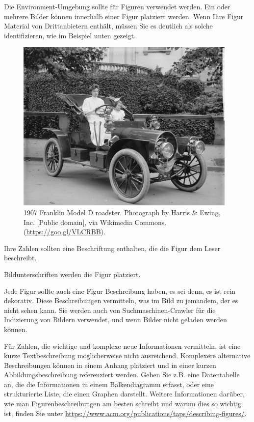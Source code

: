 \documentclass[manuscript,screen,review]{acmart}
\begin{document}
Die Environment-Umgebung sollte für Figuren verwendet werden. Ein oder mehrere Bilder können innerhalb einer Figur platziert werden. Wenn Ihre Figur Material von Drittanbietern enthält, müssen Sie es deutlich als solche identifizieren, wie im Beispiel unten gezeigt.
\begin{figure}[h]
  \centering
  \includegraphics[width=\linewidth]{sample-franklin}
  \caption{1907 Franklin Model D roadster. Photograph by Harris \&
    Ewing, Inc. [Public domain], via Wikimedia
    Commons. (\url{https://goo.gl/VLCRBB}).}
\end{figure}

Ihre Zahlen sollten eine Beschriftung enthalten, die die Figur dem Leser beschreibt.

Bildunterschriften werden die Figur platziert.

Jede Figur sollte auch eine Figur Beschreibung haben, es sei denn, es ist rein dekorativ. Diese Beschreibungen vermitteln, was im Bild zu jemandem, der es nicht sehen kann. Sie werden auch von Suchmaschinen-Crawler für die Indizierung von Bildern verwendet, und wenn Bilder nicht geladen werden können.

Für Zahlen, die wichtige und komplexe neue Informationen vermitteln, ist eine kurze Textbeschreibung möglicherweise nicht ausreichend. Komplexere alternative Beschreibungen können in einem Anhang platziert und in einer kurzen Abbildungsbeschreibung referenziert werden. Geben Sie z.B. eine Datentabelle an, die die Informationen in einem Balkendiagramm erfasst, oder eine strukturierte Liste, die einen Graphen darstellt. Weitere Informationen darüber, wie man Figurenbeschreibungen am besten schreibt und warum dies so wichtig ist, finden Sie unter \url{https://www.acm.org/publications/taps/describing-figures/}.
\end{document}
